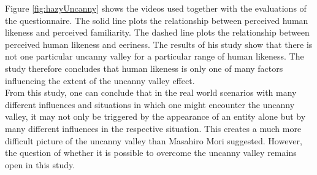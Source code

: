 Figure \ref{fig:hazyUncanny} shows the videos used together with the evaluations of the questionnaire. The solid line plots the relationship between perceived human likeness and perceived familiarity. The dashed line plots the relationship between
perceived human likeness and eeriness. The results of his study show that there is not one particular uncanny valley for a particular range of human likeness. The study therefore concludes that human likeness is only one of many factors influencing the extent of the uncanny valley effect.\\
From this study, one can conclude that in the real world scenarios with many different influences and situations in which one might encounter the uncanny valley,  it may not only be triggered by the appearance of an entity alone but by many different influences in the respective situation. This creates a much more difficult picture of the uncanny valley than Masahiro Mori suggested. However, the question of whether it is possible to overcome the uncanny valley remains open in this study.

